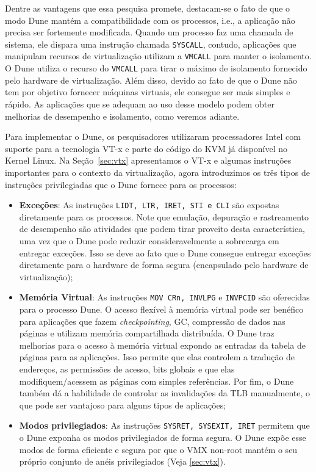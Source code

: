 Dentre as vantagens que essa pesquisa promete, destacam-se o fato de que o modo
Dune mantém a compatibilidade com os processos, i.e., a aplicação não precisa
ser fortemente modificada. Quando um processo faz uma chamada de sistema, ele
dispara uma instrução chamada \texttt{SYSCALL}, contudo, aplicações que
manipulam recursos de virtualização utilizam a \texttt{VMCALL} para manter o
isolamento. O Dune utiliza o recurso do \texttt{VMCALL} para tirar o máximo
de isolamento fornecido pelo hardware de virtualização. Além disso, devido ao
fato de que o Dune não tem por objetivo fornecer máquinas virtuais, ele
consegue ser mais simples e rápido. As aplicações que se adequam ao uso desse
modelo podem obter melhorias de desempenho e isolamento, como veremos adiante.

Para implementar o Dune, os pesquisadores utilizaram processadores Intel com
suporte para a tecnologia VT-x e parte do código do KVM já disponível no Kernel
Linux. Na Seção~\ref{sec:vtx} apresentamos o VT-x e algumas instruções
importantes para o contexto da virtualização, agora introduzimos os três tipos
de instruções privilegiadas que o Dune fornece para os processos:

\begin{itemize}
	\item \textbf{Exceções}:  As instruções \texttt{LIDT, LTR, IRET, STI e CLI} são
        expostas diretamente para os processos. Note que emulação, depuração e
        rastreamento de desempenho são atividades que podem tirar proveito
        desta característica, uma vez que o Dune pode reduzir consideravelmente
        a sobrecarga em entregar exceções. Isso se deve ao fato que o Dune
        consegue entregar exceções diretamente para o hardware de forma segura
        (encapsulado pelo hardware de virtualização);
  \item \textbf{Memória Virtual}: As instruções \texttt{MOV CRn, INVLPG} e
        \texttt{INVPCID} são oferecidas para o processo Dune. O acesso
        flexível à memória virtual pode ser benéfico para aplicações que fazem
        \emph{checkpointing}, GC, compressão de dados nas páginas e utilizam memória
        compartilhada distribuída. O Dune traz melhorias para o acesso à
        memória virtual expondo as entradas da tabela de páginas para as
        aplicações. Isso permite que elas controlem a tradução de endereços,
        as permissões de acesso, bits globais e que elas modifiquem/acessem as páginas com
        simples referências. Por fim, o Dune também dá a habilidade de
        controlar as invalidações da TLB manualmente, o que pode ser vantajoso
        para alguns tipos de aplicações;
  \item \textbf{Modos privilegiados}: As instruções \texttt{SYSRET, SYSEXIT, IRET}
        permitem que o Dune exponha os modos privilegiados de
        forma segura. O Dune expõe esse modos de forma eficiente e segura por
        que o VMX non-root mantém o seu próprio conjunto de anéis privilegiados
        (Veja \ref{sec:vtx}).
\end{itemize}

